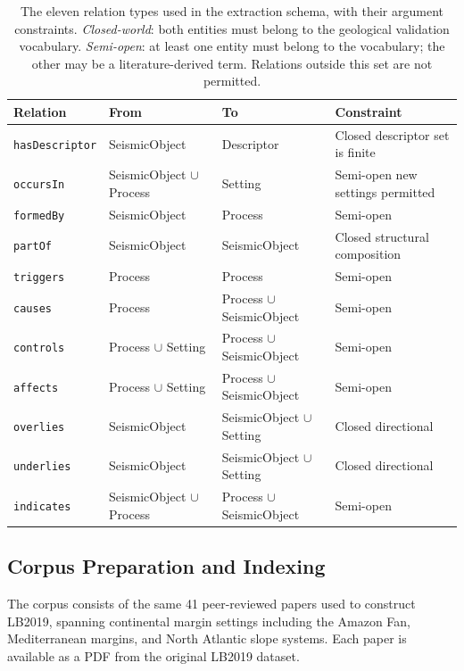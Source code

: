 \documentclass[10pt]{article}
\newcommand{\pred}[1]{\texttt{\small #1}}
\begin{document}
\begin{table}[htb]
\centering
\caption{The eleven relation types used in the extraction
  schema, with their argument constraints.
  \emph{Closed-world}: both entities must belong to the
  geological validation vocabulary.
  \emph{Semi-open}: at least one entity must belong to the
  vocabulary; the other may be a literature-derived term.
  Relations outside this set are not permitted.}
\label{tab:schema}
\small
\setlength{\tabcolsep}{4pt}
\begin{tabular}{lllp{3.8cm}}
\toprule
\textbf{Relation} & \textbf{From} & \textbf{To} &
\textbf{Constraint} \\
\midrule
\pred{hasDescriptor}
  & SeismicObject & Descriptor
  & Closed  descriptor set is finite \\
\pred{occursIn}
  & SeismicObject $\cup$ Process & Setting
  & Semi-open  new settings permitted \\
\pred{formedBy}
  & SeismicObject & Process
  & Semi-open \\
\pred{partOf}
  & SeismicObject & SeismicObject
  & Closed  structural composition \\
\pred{triggers}
  & Process & Process
  & Semi-open \\
\pred{causes}
  & Process & Process $\cup$ SeismicObject
  & Semi-open \\
\pred{controls}
  & Process $\cup$ Setting & Process $\cup$ SeismicObject
  & Semi-open \\
\pred{affects}
  & Process $\cup$ Setting & Process $\cup$ SeismicObject
  & Semi-open \\
\pred{overlies}
  & SeismicObject & SeismicObject $\cup$ Setting
  & Closed  directional \\
\pred{underlies}
  & SeismicObject & SeismicObject $\cup$ Setting
  & Closed  directional \\
\pred{indicates}
  & SeismicObject $\cup$ Process & Process $\cup$ SeismicObject
  & Semi-open \\
\bottomrule
\end{tabular}
\end{table}

\subsection{Corpus Preparation and Indexing}
\label{sec:corpus}

The corpus consists of the same 41 peer-reviewed papers used
to construct LB2019, spanning continental margin settings
including the Amazon Fan, Mediterranean margins, and North
Atlantic slope systems.
Each paper is available as a PDF from the original LB2019
dataset.
\end{document}
